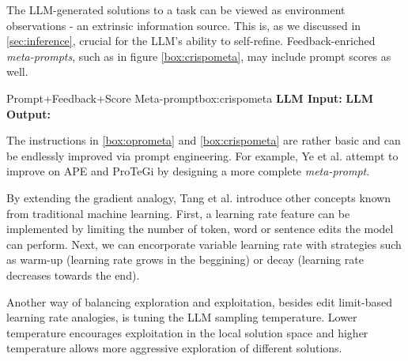 The LLM-generated solutions to a task can be viewed as environment observations - an extrinsic information source.
This is, as we discussed in \ref{sec:inference}, crucial for the LLM's ability to self-refine. 
Feedback-enriched \textit{meta-prompts}, such as in figure \ref{box:crispometa}, may include prompt scores as well.

\begin{figurebox}{Prompt+Feedback+Score Meta-prompt}{box:crispometa}
    \textbf{LLM Input:} 
    \textbf{LLM Output:} 
\end{figurebox}

The instructions in \ref{box:oprometa} and \ref{box:crispometa} are rather basic and can be endlessly
improved via prompt engineering. For example, Ye et al.\cite{ye2024promptengineeringpromptengineer} attempt to 
improve on APE and ProTeGi by designing a more complete \textit{meta-prompt}. 

By extending the gradient analogy, Tang et al.\cite{tang2024unleashingpotentiallargelanguage} introduce other concepts
known from traditional machine learning. First, a learning rate feature can be implemented by limiting the number of token, word or sentence edits the model
can perform. Next, we can encorporate variable learning rate with strategies such as warm-up (learning rate grows in the beggining) or decay (learning rate
decreases towards the end).

Another way of balancing exploration and exploitation, besides edit limit-based learning rate analogies, is tuning the LLM sampling temperature. 
Lower temperature encourages exploitation in the local solution space and higher temperature allows 
more aggressive exploration of different solutions\cite{yang2024largelanguagemodelsoptimizers}.

